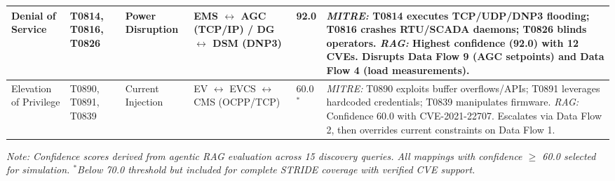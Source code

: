 \begin{table}[t]
\begin{tabular}{|p{}|p{}|p{}|p{}|p{}|p{}|}
        Denial of Service &
        T0814, T0816, T0826 &
        Power Disruption &
        EMS $\leftrightarrow$ AGC (TCP/IP) / DG $\leftrightarrow$ DSM (DNP3) &
        92.0 &
        \textit{MITRE:} T0814 executes TCP/UDP/DNP3 flooding; T0816 crashes RTU/SCADA daemons; T0826 blinds operators. \textit{RAG:} Highest confidence (92.0) with 12 CVEs. Disrupts Data Flow 9 (AGC setpoints) and Data Flow 4 (load measurements). \\[0.3em] \hline
        
        Elevation of Privilege &
        T0890, T0891, T0839 &
        Current Injection &
        EV $\leftrightarrow$ EVCS $\leftrightarrow$ CMS (OCPP/TCP) &
        60.0$^*$ &
        \textit{MITRE:} T0890 exploits buffer overflows/APIs; T0891 leverages hardcoded credentials; T0839 manipulates firmware. \textit{RAG:} Confidence 60.0 with CVE-2021-22707. Escalates via Data Flow 2, then overrides current constraints on Data Flow 1. \\[0.3em] \hline
    \end{tabular}
    \vspace{0.1cm}
    \footnotesize
    \textit{Note: Confidence scores derived from agentic RAG evaluation across 15 discovery queries. All mappings with confidence $\geq$ 60.0 selected for simulation. $^*$Below 70.0 threshold but included for complete STRIDE coverage with verified CVE support.}
\end{table}
